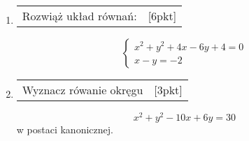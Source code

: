 \documentclass[12pt,a4paper]{article}
\begin{document}
\begin{enumerate}[1.]
		.................................................................................................
		
		\item \begin{tabular}{p{13cm} r}
			Rozwiąż układ równań: &[6pkt]\\ 
		\end{tabular}
			$$\left\{\begin{array}{l}
			x^2+y^2+4x-6y+4=0\\
			x-y=-2
			\end{array}\right.$$
		
		\item \begin{tabular}{p{13cm} r}
			Wyznacz rówanie okręgu &[3pkt]\\ 
		\end{tabular}
		$$x^2+y^2-10x+6y=30$$
		w postaci kanonicznej.
		
		
	

	\end{enumerate}
	
	
	
\end{document}
